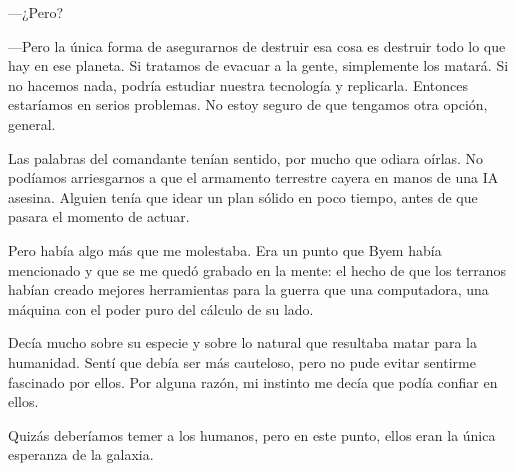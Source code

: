  —¿Pero?

—Pero la única forma de asegurarnos de destruir esa cosa es destruir todo lo que hay en ese planeta. Si tratamos de evacuar a la gente, simplemente los matará. Si no hacemos nada, podría estudiar nuestra tecnología y replicarla. Entonces estaríamos en serios problemas. No estoy seguro de que tengamos otra opción, general.

Las palabras del comandante tenían sentido, por mucho que odiara oírlas. No podíamos arriesgarnos a que el armamento terrestre cayera en manos de una IA asesina. Alguien tenía que idear un plan sólido en poco tiempo, antes de que pasara el momento de actuar.

Pero había algo más que me molestaba. Era un punto que Byem había mencionado y que se me quedó grabado en la mente: el hecho de que los terranos habían creado mejores herramientas para la guerra que una computadora, una máquina con el poder puro del cálculo de su lado.

Decía mucho sobre su especie y sobre lo natural que resultaba matar para la humanidad. Sentí que debía ser más cauteloso, pero no pude evitar sentirme fascinado por ellos. Por alguna razón, mi instinto me decía que podía confiar en ellos.

Quizás deberíamos temer a los humanos, pero en este punto, ellos eran la única esperanza de la galaxia.
